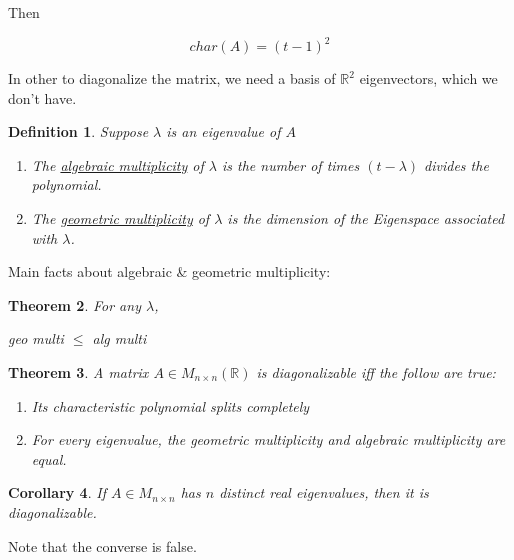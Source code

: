 \documentclass{article}
\newtheorem{theorem}{Theorem}[section]
\newtheorem{definition}[theorem]{Definition}
\newtheorem{corollary}[theorem]{Corollary}
\newtheorem{one minute paper}[theorem]{One Minute Paper}
\begin{document}
Then 

\begin{equation}
    char(A) = (t-1)^2
\end{equation}

In other to diagonalize the matrix, we need a basis of $\mathbb{R}^2$ eigenvectors, which we don't have. 

\begin{definition}
    Suppose $\lambda$ is an eigenvalue of $A$
    \begin{enumerate}
        \item The \underline{algebraic multiplicity} of $\lambda$ is the number of times $(t-\lambda)$ divides the polynomial. 
        \item The \underline{geometric multiplicity} of $\lambda$ is the dimension of the Eigenspace associated with $\lambda$. 
    \end{enumerate}
\end{definition}

Main facts about algebraic \& geometric multiplicity:

\begin{theorem}
    For any $\lambda$,
    \begin{center}
        geo multi $\leq$ alg multi
    \end{center}
\end{theorem}

\begin{theorem}
    A matrix $A \in M_{n \times n}(\mathbb{R})$ is diagonalizable iff the follow are true:
    \begin{enumerate}
        \item Its characteristic polynomial splits completely
        \item For every eigenvalue, the geometric multiplicity and algebraic multiplicity are equal. 
    \end{enumerate} 
\end{theorem}

\begin{corollary}
    If $A \in M_{n \times n}$ has $n$ distinct real eigenvalues, then it is diagonalizable.  
\end{corollary}

Note that the converse is false. 
\end{document}

